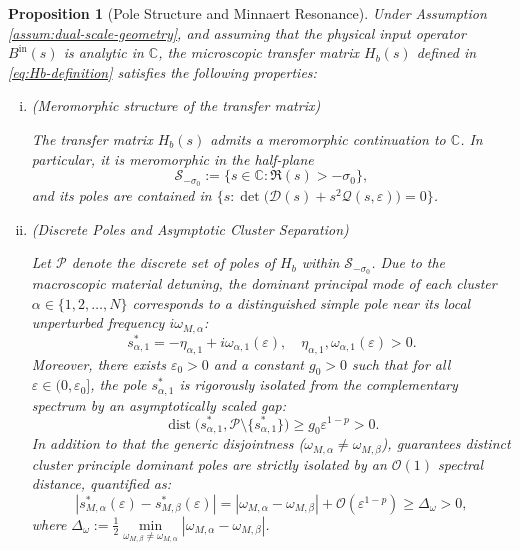\documentclass[11pt,a4paper]{article}
\numberwithin{equation}{section}
\newtheorem{proposition}[theorem]{Proposition}
\begin{document}
\begin{proposition}[Pole Structure and Minnaert Resonance]\label{proposition}
  Under Assumption \ref{assum:dual-scale-geometry}, and assuming that the physical input operator $B^{\mathrm{in}}(s)$ is analytic in $\mathbb{C}$, the microscopic transfer matrix $H_b(s)$ defined in \eqref{eq:Hb-definition} satisfies the following properties:
\begin{enumerate}[(i)]
    \item \big(\textit{Meromorphic structure of the transfer matrix}\big) 
    
    The transfer matrix $H_b(s)$ admits a meromorphic continuation to $\mathbb{C}$. In particular, it is meromorphic in the half-plane $$\mathcal{S}_{-\sigma_0} := \Big\{s \in \mathbb{C} : \Re(s) > -\sigma_0\Big\},$$ and its poles are contained in $\Big\{s : \det\big(\mathcal{D}(s)+s^2\mathcal{Q}(s,\varepsilon)\big) = 0\Big\}$.

   \item \big(\textit{Discrete Poles and Asymptotic Cluster Separation}\big)
 
   Let $\mathcal{P}$ denote the discrete set of poles of $H_b$ within $\mathcal{S}_{-\sigma_0}$. Due to the macroscopic material detuning, the dominant principal mode of each cluster $\alpha \in \Big\{1,2,\ldots,N\Big\}$ corresponds to a distinguished simple pole near its local unperturbed frequency $i\omega_{M,\alpha}$:$$s_{\alpha, 1}^\ast = -\eta_{\alpha, 1} + i\omega_{\alpha, 1}(\varepsilon), \quad \eta_{\alpha, 1}, \omega_{\alpha, 1}(\varepsilon) > 0.$$
   Moreover, there exists $\varepsilon_0 > 0$ and a constant $g_0 > 0$ such that for all $\varepsilon \in (0, \varepsilon_0]$, the pole $s_{\alpha, 1}^\ast$ is rigorously isolated from the complementary spectrum by an asymptotically scaled gap:$$\operatorname{dist}\bigl(s_{\alpha, 1}^\ast, \mathcal{P} \setminus \{s_{\alpha, 1}^\ast\}\bigr) \ge g_0 \varepsilon^{1-p} > 0.$$
   In addition to that the generic disjointness ($\omega_{M,\alpha} \ne \omega_{M,\beta}$), guarantees distinct cluster principle dominant poles are strictly isolated by an $\mathcal{O}(1)$ spectral distance, quantified as:
\begin{equation}
    |s_{M,\alpha}^\ast(\varepsilon) - s_{M,\beta}^\ast(\varepsilon)| = |\omega_{M,\alpha} - \omega_{M,\beta}| + \mathcal{O}(\varepsilon^{1-p}) \ge \Delta_\omega > 0,
\end{equation}
where $\Delta_\omega := \frac{1}{2} \min\limits_{\omega_{M,\beta} \neq \omega_{M,\alpha}} |\omega_{M,\alpha} - \omega_{M,\beta}|$.


\end{enumerate}
\end{proposition}
\end{document}
